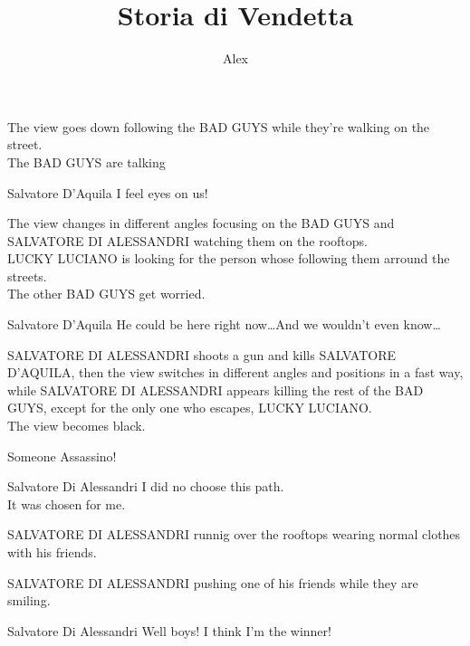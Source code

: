 \documentclass{screenplay}[2020/03/26]
\title{Storia di Vendetta}
\author{Alex}
\begin{document}
\coverpage


\fadein
{}
The view goes down following the BAD GUYS while they're walking on
the street.
\\The BAD GUYS are talking
\begin{dialogue}[worried]{Salvatore D'Aquila}
I feel eyes on us!
\end{dialogue}
The view changes in different angles focusing on the BAD GUYS and SALVATORE DI ALESSANDRI watching them on the rooftops.
\\LUCKY LUCIANO is looking for the person whose following them arround the streets.
\\The other BAD GUYS get worried.
\begin{dialogue}[loudly]{Salvatore D'Aquila}
He could be here right now\dots And we wouldn't even know\dots
\end{dialogue}
SALVATORE DI ALESSANDRI shoots a gun and kills SALVATORE D'AQUILA, then the view switches in different angles and positions in a fast way, while SALVATORE DI ALESSANDRI appears killing the rest of the BAD GUYS, except for the only one who escapes, LUCKY LUCIANO.
\\The view becomes black.
\begin{dialogue}[screamming]{Someone}
Assassino!
\end{dialogue}


\begin{dialogue}[narrating]{Salvatore Di Alessandri}
I did no choose this path.
\\It was chosen for me.
\end{dialogue}


\fadein
{}
SALVATORE DI ALESSANDRI runnig over the rooftops wearing normal clothes with his friends.


SALVATORE DI ALESSANDRI pushing one of his friends while they are smiling.
\begin{dialogue}[excited]{Salvatore Di Alessandri}
Well boys! I think I'm the winner!
\end{dialogue}
\end{document}
